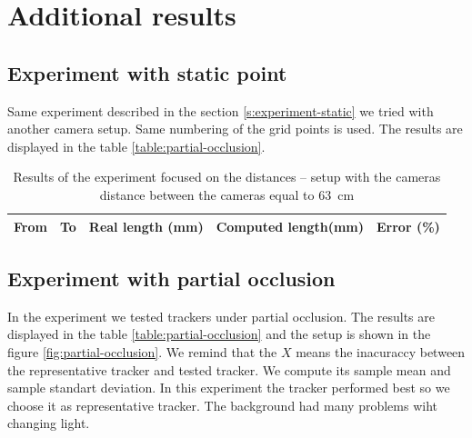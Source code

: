 \chapter{Additional results}

\section{Experiment with static point}

Same experiment described in the section \ref{s:experiment-static} we tried
with another camera setup. Same numbering of the grid points is used. The
results are displayed in the table \ref{table:partial-occlusion}.

\begin{table}[h!]
\centering
\begin{tabular}{|r|r|r|r|r|}
\hline
From    & To    & Real length (mm) & Computed length(mm) & Error (\%) \\
\hline
\hline

\hline
\end{tabular}
\caption{Results of the experiment focused on the distances -- setup with the cameras distance between the cameras equal to 63~cm}
\label{table:distances-second}
\end{table}

\section{Experiment with partial occlusion}

In the experiment we tested trackers under partial occlusion. The results are
displayed in the table \ref{table:partial-occlusion} and the setup is shown in
the figure \ref{fig:partial-occlusion}. We remind that the $X$ means the
inacuraccy between the representative tracker and tested tracker. We compute
its sample mean and sample standart deviation. In this experiment the \hsv{}
tracker performed best so we choose it as representative tracker. The
\simback{} background had many problems wiht changing light.


